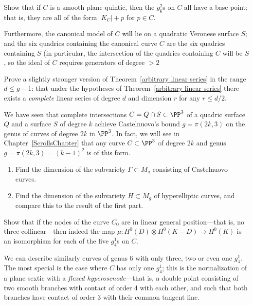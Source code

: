 \begin{exercise}
Show that if $C$ is a smooth plane quintic, then the $g^2_6$s on $C$ all have a base point; that is, they are all of the form $|K_C| + p$ for $p \in C$. 

Furthermore, the canonical model of $C$ will lie on a quadratic Veronese surface $S$; and the six
quadrics containing the canonical curve $C$ are the six quadrics containing $S$ (in particular, the intersection of the quadrics containing $C$ will be $S$, so
the ideal of $C$ requires generators of degree $>2$
\end{exercise} 

\begin{exercise}
Prove a slightly stronger version of Theorem~\ref{arbitrary linear series} in the range $d \leq g-1$: that under the hypotheses of Theorem~\ref{arbitrary linear series} there exists a \emph{complete} linear series of degree $d$ and dimension $r$ for any $r \leq d/2$.
\end{exercise}

\begin{exercise}\label{rarity of Castelnuovo}
We have seen that complete intersections $C = Q \cap S \subset \PP^3$ of a quadric surface $Q$ and a surface $S$ of degree $k$ achieve Castelnuovo's bound $g = \pi(2k, 3)$ on the genus of curves of degree $2k$ in $\PP^3$. In fact, we will see in Chapter~\ref{ScrollsChapter} that any curve $C \subset \PP^3$ of degree $2k$ and genus $g = \pi(2k, 3) = (k-1)^2$ is of this form.
\begin{enumerate}
\item Find the dimension of the subvariety $\Gamma \subset M_g$ consisting of Castelnuovo curves.
\item Find the dimension of the subvariety $H \subset M_g$ of hyperelliptic curves, and compare this to the result of the first part.
\end{enumerate}
\end{exercise}


\begin{exercise}\label{nonreduced Wrd}
Show that if the nodes of the curve $C_0$ are in linear general position---that is, no three collinear---then indeed the map $\mu : H^0(D) \otimes H^0(K-D) \to H^0(K)$ is an isomorphism for each of the five $g^1_4$s on $C$.
\end{exercise}

We can describe similarly curves of genus 6 with only three, two or even one $g^1_4$. The most special is the case where $C$ has only one $g^1_4$; this is the normalization of a plane sextic with a \emph{flexed hyperoscnode}---that is, a double point consisting of two smooth branches with contact of order 4 with each other, and such that both branches have contact of order 3 with their common tangent line.

